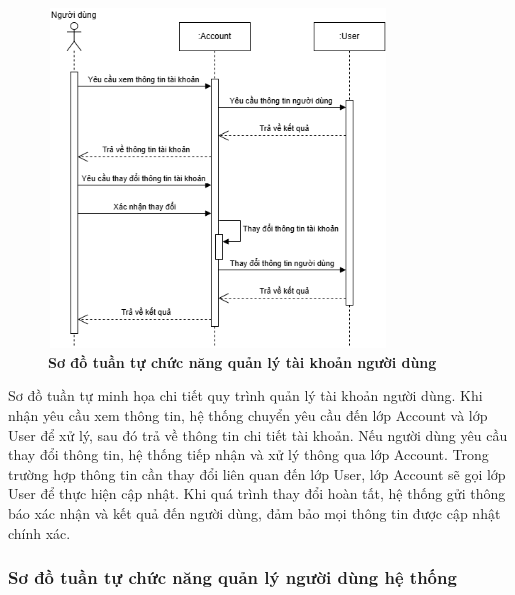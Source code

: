 \begin{figure}[H]
	\centering
	\includegraphics[width=9cm,height=9cm]{Images/sequence/user/account_info.drawio.png}
	\caption[Sơ đồ tuần tự chức năng quản lý tài khoản người dùng]{\bfseries \fontsize{12pt}{0pt}
		\selectfont Sơ đồ tuần tự chức năng quản lý tài khoản người dùng}
	\label{sequence_account} %
\end{figure}
Sơ đồ tuần tự minh họa chi tiết quy trình quản lý tài khoản người dùng. Khi nhận yêu cầu xem thông tin, hệ thống chuyển yêu cầu đến lớp Account và lớp User để xử lý,
sau đó trả về thông tin chi tiết tài khoản. Nếu người dùng yêu cầu thay đổi thông tin, hệ thống tiếp nhận và xử lý thông qua lớp Account. Trong trường hợp thông tin cần thay đổi liên quan đến lớp User,
lớp Account sẽ gọi lớp User để thực hiện cập nhật. Khi quá trình thay đổi hoàn tất, hệ thống gửi thông báo xác nhận và kết quả đến người dùng, đảm bảo mọi thông tin được cập nhật chính xác.

\subsubsection{Sơ đồ tuần tự chức năng quản lý người dùng hệ thống}

